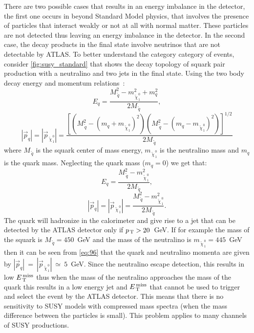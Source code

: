 There are two possible cases that results in an energy imbalance in the
detector, the first one occurs in beyond Standard Model physics, that involves
the presence of particles that interact weakly or not at all with normal
matter. These particles are not detected thus leaving an energy imbalance in the
detector. In the second case, the decay products in the final state involve
neutrinos that are not detectable by ATLAS\@. To better understand the category
category of events, consider \cref{fig:susy_standard} that shows the decay
topology of squark pair production with a neutralino and two jets in the final
state. Using the two body decay energy and momentum relations~\cite{PDG}:
\begin{equation}
  \label{eq:93}
  E_q = \frac{M_{\, \tilde{q}}^2 - m_{\, \tilde{\chi}_{\, 1}^{\, 0}}^2 + m_q^2}{2
    M_{\, \tilde{q}}},
\end{equation}
\begin{equation}
  \label{eq:94}
  |\vec{p}_q| = |\vec{p}_{\, \tilde{\chi}_{\, 1}^{\, 0}}| = \frac{\left[ \left(
        M_{\, \tilde{q}}^2 - (m_q + m_{\, \tilde{\chi}_{\, 1}^{\, 0}})^2
      \right) \left( M_{\, \tilde{q}}^2 - (m_q - m_{\, \tilde{\chi}_{\, 1}^{\,
            0}})^2 \right) \right]^{1/2}}{2 M_{\, \tilde{q}}}
\end{equation}
where $M_{\, \tilde{q}}$ is the squark center of mass energy,
$m_{\, \tilde{\chi}_{\, 1}^{\, 0}}$ is the neutralino mass and $m_q$ is the
quark mass. Neglecting the quark mass ($m_q = 0$) we get that:
\begin{equation}
  \label{eq:95}
  E_q = \frac{M_{\, \tilde{q}}^2 - m_{\, \tilde{\chi}_{\, 1}^{\, 0}}^2}{2 M_{\,
      \tilde{q}}},
\end{equation}
\begin{equation}
  \label{eq:96}
  |\vec{p}_q| = |\vec{p}_{\, \tilde{\chi}_{\, 1}^{\, 0}}| = \frac{M_{\,
      \tilde{q}}^2 - m_{\, \tilde{\chi}_{\, 1}^{\, 0}}^2}{2 M_{\, \tilde{q}}}.
\end{equation}
The quark will hadronize in the calorimeter and give rise to a jet that can be
detected by the ATLAS detector only if $p_\mathrm{\, T} > 20$~GeV. If for example the mass
of the squark is $M_{\, \tilde{q}} = 450$~GeV and the mass of the neutralino is
$m_{\, \tilde{\chi}_{\, 1}^{\, 0}} = 445$~GeV then it can be seen from
\cref{eq:96} that the quark and neutralino momenta are given by
$|\vec{p}_q|~=~|\vec{p}_{\, \tilde{\chi}_{\, 1}^{\, 0}}|~\simeq~5$~GeV. Since
the neutralino escape detection, this results in low $E_\mathrm{\, T}^\mathrm{\, miss}$ thus when the mass
of the neutralino approaches the mass of the quark this results in a low energy
jet and $E_\mathrm{\, T}^\mathrm{\, miss}$ that cannot be used to trigger and select the event by the ATLAS
detector. This means that there is no sensitivity to SUSY models with compressed
mass spectra (when the mass difference between the particles is small). This
problem applies to many channels of SUSY productions.



